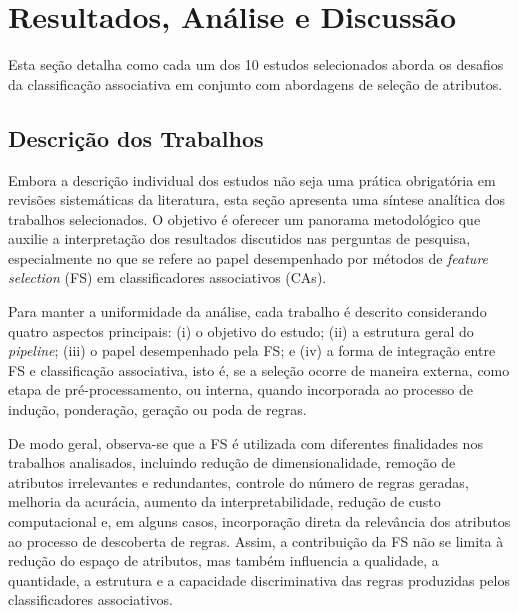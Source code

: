 \section{Resultados, Análise e Discussão}\label{sec:resultados_analise_discussao}

Esta seção detalha como cada um dos 10 estudos selecionados aborda os desafios da classificação associativa em conjunto com abordagens de seleção de atributos.


\subsection{Descrição dos Trabalhos}
\label{sec:descricao-trabalhos}

Embora a descrição individual dos estudos não seja uma prática obrigatória em revisões sistemáticas da literatura, esta seção apresenta uma síntese analítica dos trabalhos selecionados. O objetivo é oferecer um panorama metodológico que auxilie a interpretação dos resultados discutidos nas perguntas de pesquisa, especialmente no que se refere ao papel desempenhado por métodos de \textit{feature selection} (FS) em classificadores associativos (CAs).

Para manter a uniformidade da análise, cada trabalho é descrito considerando quatro aspectos principais: (i) o objetivo do estudo; (ii) a estrutura geral do \textit{pipeline}; (iii) o papel desempenhado pela FS; e (iv) a forma de integração entre FS e classificação associativa, isto é, se a seleção ocorre de maneira externa, como etapa de pré-processamento, ou interna, quando incorporada ao processo de indução, ponderação, geração ou poda de regras.

De modo geral, observa-se que a FS é utilizada com diferentes finalidades nos trabalhos analisados, incluindo redução de dimensionalidade, remoção de atributos irrelevantes e redundantes, controle do número de regras geradas, melhoria da acurácia, aumento da interpretabilidade, redução de custo computacional e, em alguns casos, incorporação direta da relevância dos atributos ao processo de descoberta de regras. Assim, a contribuição da FS não se limita à redução do espaço de atributos, mas também influencia a qualidade, a quantidade, a estrutura e a capacidade discriminativa das regras produzidas pelos classificadores associativos.

